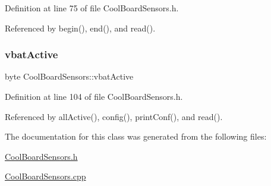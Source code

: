 Definition at line 75 of file Cool\+Board\+Sensors.\+h.



Referenced by begin(), end(), and read().

\mbox{\label{classCoolBoardSensors_af5039ad760b0ff0aa7eee16c55e81702}} 
\subsubsection{\texorpdfstring{vbat\+Active}{vbatActive}}
{\footnotesize\ttfamily byte Cool\+Board\+Sensors\+::vbat\+Active\hspace{0.3cm}{\ttfamily [private]}}



Definition at line 104 of file Cool\+Board\+Sensors.\+h.



Referenced by all\+Active(), config(), print\+Conf(), and read().



The documentation for this class was generated from the following files\+:\begin{DoxyCompactItemize}
\item 
\hyperlink{CoolBoardSensors_8h}{Cool\+Board\+Sensors.\+h}\item 
\hyperlink{CoolBoardSensors_8cpp}{Cool\+Board\+Sensors.\+cpp}\end{DoxyCompactItemize}
